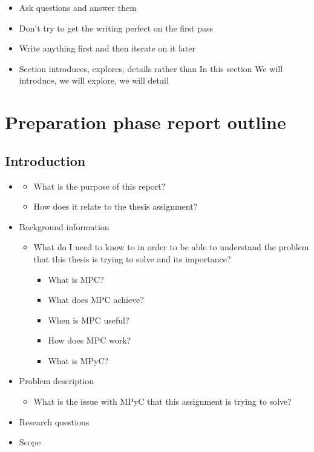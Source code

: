 \begin{itemize}
\item
  Ask questions and answer them
\item
  Don't try to get the writing perfect on the first pass
\item
  Write anything first and then iterate on it later
\item
  Section introduces, explores, details rather than In this section We
  will introduce, we will explore, we will detail
\end{itemize}

\hypertarget{notes__05000-prep.md}{}
\hypertarget{notes__05000-prep.md__preparation-phase-report-outline}{%
\chapter{Preparation phase report
outline}\label{notes__05000-prep.md__preparation-phase-report-outline}}

\hypertarget{notes__05000-prep.md__introduction}{%
\section{Introduction}\label{notes__05000-prep.md__introduction}}

\begin{itemize}
\item
  \begin{itemize}
  \tightlist
  \item
    What is the purpose of this report?
  \item
    How does it relate to the thesis assignment?
  \end{itemize}
\item
  Background information

  \begin{itemize}
  \tightlist
  \item
    What do I need to know to in order to be able to understand the
    problem that this thesis is trying to solve and its importance?

    \begin{itemize}
    \tightlist
    \item
      What is MPC?
    \item
      What does MPC achieve?
    \item
      When is MPC useful?
    \item
      How does MPC work?
    \item
      What is MPyC?
    \end{itemize}
  \end{itemize}
\item
  Problem description

  \begin{itemize}
  \tightlist
  \item
    What is the issue with MPyC that this assignment is trying to solve?
  \end{itemize}
\item
  Research questions
\item
  Scope
\end{itemize}

